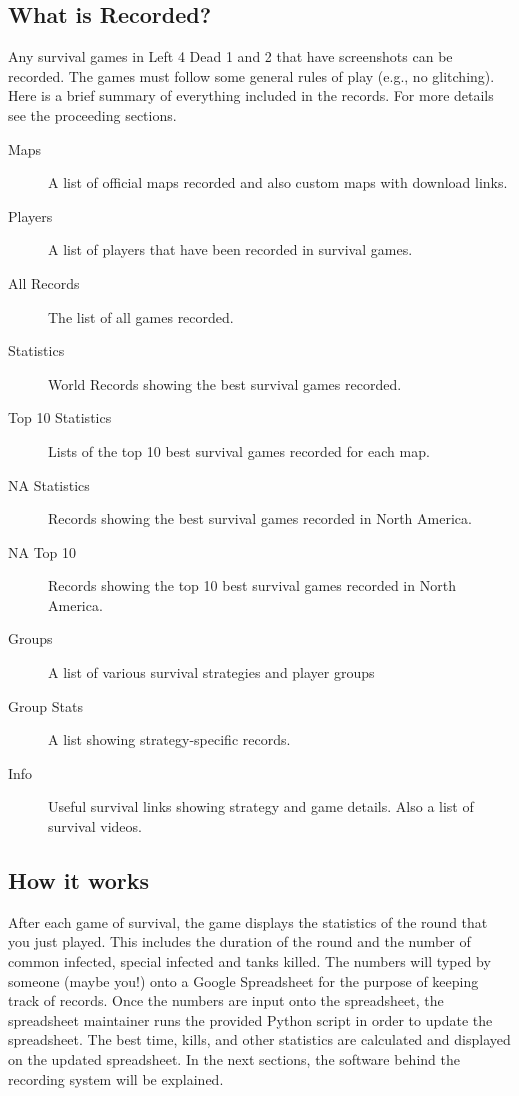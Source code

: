 \subsection{What is Recorded?}
Any survival games in Left 4 Dead 1 and 2 that have screenshots can be recorded. The games must follow some general rules of play (e.g., no glitching). Here is a brief summary of everything included in the records. For more details see the proceeding sections.
\begin{description}
\item[Maps]A list of official maps recorded and also custom maps with download links.
\item[Players]A list of players that have been recorded in survival games.
\item[All Records]The list of all games recorded.
\item[Statistics]World Records showing the best survival games recorded.
\item[Top 10 Statistics]Lists of the top 10 best survival games recorded for each map.
\item[NA Statistics]Records showing the best survival games recorded in North America.
\item[NA Top 10]Records showing the top 10 best survival games recorded in North America.
\item[Groups]A list of various survival strategies and player groups
\item[Group Stats]A list showing strategy-specific records.
\item[Info]Useful survival links showing strategy and game details. Also a list of survival videos.
\end{description}

\subsection{How it works}
After each game of survival, the game displays the statistics of the round that you just played. This includes the duration of the round and the number of common infected, special infected and tanks killed. The numbers will typed by someone (maybe you!) onto a Google Spreadsheet for the purpose of keeping track of records. Once the numbers are input onto the spreadsheet, the spreadsheet maintainer runs the provided Python script in order to update the spreadsheet. The best time, kills, and other statistics are calculated and displayed on the updated spreadsheet. In the next sections, the software behind the recording system will be explained.


